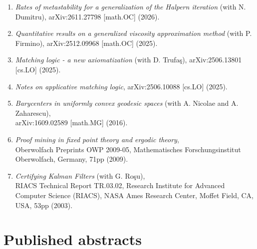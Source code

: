 \documentclass[12pt]{article}
\begin{document}
\begin{enumerate}

\item {\em Rates of metastability for a generalization of the Halpern iteration} (with N. Dumitru), arXiv:2611.27798 [math.OC] (2026).

\item {\em Quantitative results on a generalized viscosity approximation method} (with P. Firmino), arXiv:2512.09968 [math.OC] (2025).

\item {\em Matching logic - a new axiomatization} (with D. Trufa\c s), arXiv:2506.13801 [cs.LO] (2025).

\item {\em Notes on applicative matching logic}, arXiv:2506.10088 [cs.LO] (2025).

\item {\em Barycenters in uniformly convex geodesic spaces}
(with A. Nicolae and A. Zaharescu), \\
arXiv:1609.02589 [math.MG] (2016).

\item {\em Proof mining in fixed point theory and ergodic theory},\\
 Oberwolfach Preprints OWP 2009-05, Mathematisches Forschungsinstitut Oberwolfach, Germany, 71pp (2009).
 
\item \label{LL+luta}
{\em Certifying Kalman Filters} (with G. Ro\c su),\\
 RIACS Technical Report TR.03.02, Research Institute for Advanced Computer Science (RIACS), 
 NASA Ames Research Center, Moffet Field, CA, USA, 53pp (2003).
 
\end{enumerate}


\section{Published abstracts}
\end{document}
